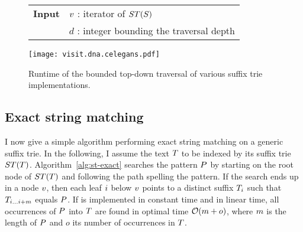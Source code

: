 \begin{figure*}[t]
\begin{center}
\begin{minipage}[t]{.7\textwidth}
\begin{algorithm}[H]
\begin{tabular}{ll}
\textbf{Input}  & $v$ : iterator of $ST(S)$\\
 			    & $d$ : integer bounding the traversal depth\\
\end{tabular}
\begin{algorithmic}[1]
		\Repeat
			\State {}
		\Until {}
	\EndIf
\EndIf
\end{algorithmic}
\label{alg:st-dfs}
\end{algorithm}
\end{minipage}
\end{center}
\end{figure*}

\begin{figure}[b]
\begin{center}
\caption[Top-down traversal runtime]{Runtime of the bounded top-down traversal of various suffix trie implementations.}
\label{fig:visit-dna}
\texttt{[image: visit.dna.celegans.pdf]}
\end{center}
\end{figure}

\subsection{Exact string matching}
\label{sec:index:algo:exact}

I now give a simple algorithm performing exact string matching on a generic suffix trie.
In the following, I assume the text $T$ to be indexed by its suffix trie $ST(T)$.
Algorithm~\ref{alg:st-exact} searches the pattern $P$ by starting on the root node of $ST(T)$ and following the path spelling the pattern.
If the search ends up in a node $v$, then each leaf $i$ below $v$ points to a distinct suffix ${T}_{i}$ such that ${T}_{{i}\dots{i+m}}$ equals $P$.
If  is implemented in constant time and  in linear time, all occurrences of $P$ into $T$ are found in optimal time $\mathcal{O}(m+o)$, where $m$ is the length of $P$ and $o$ its number of occurrences in $T$.

